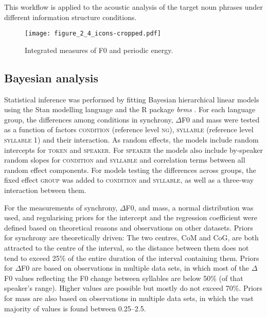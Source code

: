This workflow is applied to the acoustic analysis of the target noun phrases under different information structure conditions. 


\begin{figure}
\texttt{[image: figure\_2\_4\_icons-cropped.pdf]}
\caption{Integrated measures of F0 and periodic energy.}
\label{fig:2.4}
\end{figure}

\subsection{Bayesian analysis}
\label{sec:2.2.4}
Statistical inference was performed by fitting Bayesian hierarchical linear models using the Stan modelling language \citep{CarpenterEtAl2017} and the R package \textit{brms} \citep{Bürkner2016}. For each language group, the differences among conditions in synchrony, ${\Delta}$F0 and mass were tested as a function of factors \textsc{condition} (reference level \textsc{ng}), \textsc{syllable} (reference level \textsc{syllable 1}) and their interaction. As random effects, the models include random intercepts for \textsc{token} and \textsc{speaker}. For \textsc{speaker} the models also include by-speaker random slopes for \textsc{condition} and \textsc{syllable} and correlation terms between all random effect components. For models testing the differences across groups, the fixed effect \textsc{group} was added to \textsc{condition} and \textsc{syllable}, as well as a three-way interaction between them.

For the measurements of synchrony, ${\Delta}$F0, and mass, a normal distribution was used, and regularising priors for the intercept and the regression coefficient were defined based on theoretical reasons and observations on other datasets. Priors for synchrony are theoretically driven: The two centres, CoM and CoG, are both attracted to the centre of the interval, so the distance between them does not tend to exceed 25\% of the entire duration of the interval containing them. Priors for ${\Delta}$F0 are based on observations in multiple data sets, in which most of the ${\Delta}$F0 values reflecting the F0 change between syllables are below 50\% (of that speaker’s range). Higher values are possible but mostly do not exceed 70\%. Priors for mass are also based on observations in multiple data sets, in which the vast majority of values is found between 0.25--2.5.

